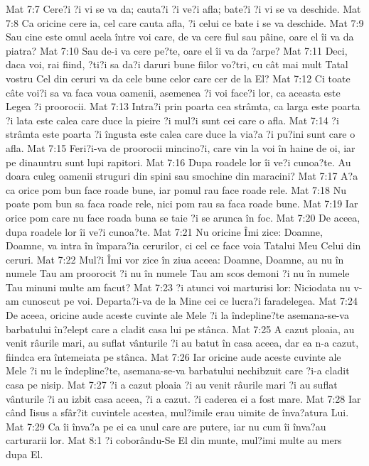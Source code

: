 Mat 7:7  Cere?i ?i vi se va da; cauta?i ?i ve?i afla; bate?i ?i vi se va deschide.
Mat 7:8  Ca oricine cere ia, cel care cauta afla, ?i celui ce bate i se va deschide.
Mat 7:9  Sau cine este omul acela între voi care, de va cere fiul sau pâine, oare el îi va da piatra?
Mat 7:10  Sau de-i va cere pe?te, oare el îi va da ?arpe?
Mat 7:11  Deci, daca voi, rai fiind, ?ti?i sa da?i daruri bune fiilor vo?tri, cu cât mai mult Tatal vostru Cel din ceruri va da cele bune celor care cer de la El?
Mat 7:12  Ci toate câte voi?i sa va faca voua oamenii, asemenea ?i voi face?i lor, ca aceasta este Legea ?i proorocii.
Mat 7:13  Intra?i prin poarta cea strâmta, ca larga este poarta ?i lata este calea care duce la pieire ?i mul?i sunt cei care o afla.
Mat 7:14  ?i strâmta este poarta ?i îngusta este calea care duce la via?a ?i pu?ini sunt care o afla.
Mat 7:15  Feri?i-va de proorocii mincino?i, care vin la voi în haine de oi, iar pe dinauntru sunt lupi rapitori.
Mat 7:16  Dupa roadele lor îi ve?i cunoa?te. Au doara culeg oamenii struguri din spini sau smochine din maracini?
Mat 7:17  A?a ca orice pom bun face roade bune, iar pomul rau face roade rele.
Mat 7:18  Nu poate pom bun sa faca roade rele, nici pom rau sa faca roade bune.
Mat 7:19  Iar orice pom care nu face roada buna se taie ?i se arunca în foc.
Mat 7:20  De aceea, dupa roadele lor îi ve?i cunoa?te.
Mat 7:21  Nu oricine Îmi zice: Doamne, Doamne, va intra în împara?ia cerurilor, ci cel ce face voia Tatalui Meu Celui din ceruri.
Mat 7:22  Mul?i Îmi vor zice în ziua aceea: Doamne, Doamne, au nu în numele Tau am proorocit ?i nu în numele Tau am scos demoni ?i nu în numele Tau minuni multe am facut?
Mat 7:23  ?i atunci voi marturisi lor: Niciodata nu v-am cunoscut pe voi. Departa?i-va de la Mine cei ce lucra?i faradelegea.
Mat 7:24  De aceea, oricine aude aceste cuvinte ale Mele ?i la îndepline?te asemana-se-va barbatului în?elept care a cladit casa lui pe stânca.
Mat 7:25  A cazut ploaia, au venit râurile mari, au suflat vânturile ?i au batut în casa aceea, dar ea n-a cazut, fiindca era întemeiata pe stânca.
Mat 7:26  Iar oricine aude aceste cuvinte ale Mele ?i nu le îndepline?te, asemana-se-va barbatului nechibzuit care ?i-a cladit casa pe nisip.
Mat 7:27  ?i a cazut ploaia ?i au venit râurile mari ?i au suflat vânturile ?i au izbit casa aceea, ?i a cazut. ?i caderea ei a fost mare.
Mat 7:28  Iar când Iisus a sfâr?it cuvintele acestea, mul?imile erau uimite de înva?atura Lui.
Mat 7:29  Ca îi înva?a pe ei ca unul care are putere, iar nu cum îi înva?au carturarii lor.
Mat 8:1  ?i coborându-Se El din munte, mul?imi multe au mers dupa El.
